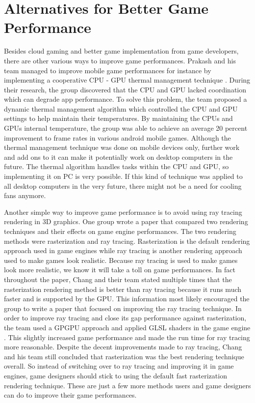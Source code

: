 \documentclass{article}
\begin{document}
\section{Alternatives for Better Game Performance}
Besides cloud gaming and better game implementation from game developers, there are other various ways to improve game performances. Prakash and his team managed to improve mobile game performances for instance by implementing a cooperative CPU - GPU thermal management technique \cite{10.1145/2897937.2898031}. During their research, the group discovered that the CPU and GPU lacked coordination which can degrade app performance. To solve this problem, the team proposed a dynamic thermal management algorithm which controlled the CPU and GPU settings to help maintain their temperatures. By maintaining the CPUs and GPUs internal temperature, the group was able to achieve an average 20 percent improvement to frame rates in various android mobile games. Although the thermal management technique was done on mobile devices only, further work and add ons to it can make it potentially work on desktop computers in the future. The thermal algorithm handles tasks within the CPU and GPU, so implementing it on PC is very possible. If this kind of technique was applied to all desktop computers in the very future, there might not be a need for cooling fans anymore. 

Another simple way to improve game performance is to avoid using ray tracing rendering in 3D graphics. One group wrote a paper that compared two rendering techniques and their effects on game engine performances. The two rendering methods were rasterization and ray tracing. Rasterization is the default rendering approach used in game engines while ray tracing is another rendering approach used to make games look realistic. Because ray tracing is used to make games look more realistic, we know it will take a toll on game performances. In fact throughout the paper, Chang and their team stated multiple times that the rasterization rendering method is better than ray tracing because it runs much faster and is supported by the GPU. This information most likely encouraged the group to write a paper that focused on improving the ray tracing technique. In order to improve ray tracing and close its gap performance against rasterization, the team used a GPGPU approach and applied GLSL shaders in the game engine \cite{7251842}. This slightly increased game performance and made the run time for ray tracing more reasonable. Despite the decent improvements made to ray tracing, Chang and his team still concluded that rasterization was the best rendering technique overall. So instead of switching over to ray tracing and improving it in game engines, game designers should stick to using the default fast rasterization rendering technique. These are just a few more methods users and game designers can do to improve their game performances. 
\end{document}
